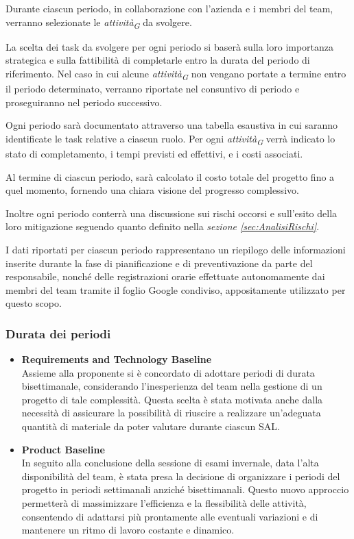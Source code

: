 Durante ciascun periodo, in collaborazione con l'azienda e i membri del team, verranno selezionate le \textit{attività}\textsubscript{\textit{G}} da svolgere.

La scelta dei task da svolgere per ogni periodo si baserà sulla loro importanza strategica e sulla fattibilità di completarle entro la durata del periodo di riferimento. Nel caso in cui alcune \textit{attività}\textsubscript{\textit{G}} non vengano portate a termine entro il periodo determinato, verranno riportate nel consuntivo di periodo e proseguiranno nel periodo successivo.

Ogni periodo sarà documentato attraverso una tabella esaustiva in cui saranno identificate le task relative a ciascun ruolo. Per ogni \textit{attività}\textsubscript{\textit{G}} verrà indicato lo stato di completamento, i tempi previsti ed effettivi, e i costi associati.

Al termine di ciascun periodo, sarà calcolato il costo totale del progetto fino a quel momento, fornendo una chiara visione del progresso complessivo.

Inoltre ogni periodo conterrà una discussione sui rischi occorsi e sull'esito della loro mitigazione seguendo quanto definito nella \textit{sezione \ref{sec:AnalisiRischi}}.

I dati riportati per ciascun periodo rappresentano un riepilogo delle informazioni inserite durante la fase di pianificazione e di preventivazione da parte del responsabile, nonché delle registrazioni orarie effettuate autonomamente dai membri del team tramite il foglio Google condiviso, appositamente utilizzato per questo scopo.

\subsubsection{Durata dei periodi}
\begin{itemize}
    \item \textbf{Requirements and Technology Baseline} \\
    Assieme alla proponente si è concordato di adottare periodi di durata bisettimanale, considerando l'inesperienza del team nella gestione di un progetto di tale complessità. Questa scelta è stata motivata anche dalla necessità di assicurare la possibilità di riuscire a realizzare un'adeguata quantità di materiale da poter valutare durante ciascun SAL.
    \item \textbf{Product Baseline} \\
    In seguito alla conclusione della sessione di esami invernale, data l'alta disponibilità del team, è stata presa la decisione di organizzare i periodi del progetto in periodi settimanali anziché bisettimanali. Questo nuovo approccio permetterà di massimizzare l'efficienza e la flessibilità delle attività, consentendo di adattarsi più prontamente alle eventuali variazioni e di mantenere un ritmo di lavoro costante e dinamico.
\end{itemize}

